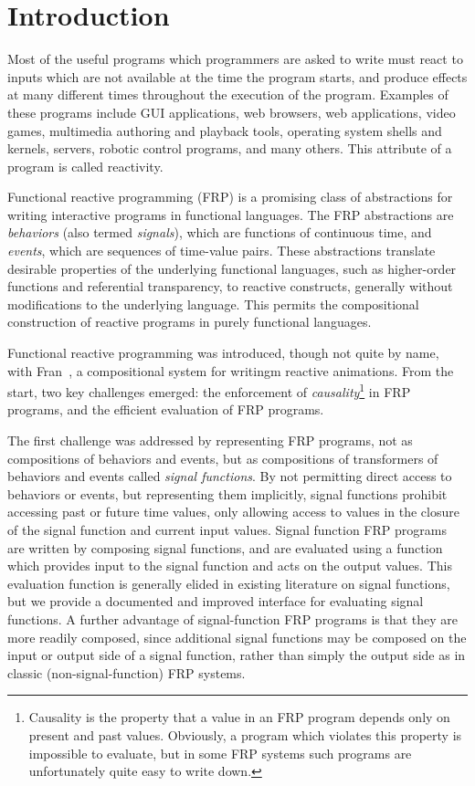 \chapter{Introduction}
\label{chapter:Introduction}

Most of the useful programs which programmers are asked to write must react to inputs which are not available at the time the program starts,
and produce effects at many different times throughout the execution of the program. Examples of these programs include GUI applications,
web browsers, web applications, video games, multimedia authoring and playback tools, operating system shells and kernels, servers,
robotic control programs, and many others. This attribute of a program is called reactivity.

Functional reactive programming (FRP) is a promising class of abstractions for
writing interactive programs in functional languages. The FRP abstractions are
{\em behaviors} (also termed {\em signals}), which are functions of continuous
time, and {\em events}, which are sequences of time-value pairs. These
abstractions translate desirable properties of the underlying functional
languages, such as higher-order functions and referential transparency, to
reactive constructs, generally without modifications to the underlying language.
This permits the compositional construction of reactive programs in purely
functional languages.

Functional reactive programming was introduced, though not quite by name, with
Fran~\cite{Elliott1997}, a compositional system for writingm reactive
animations. From the start, two key challenges emerged: the enforcement of
{\em causality}\footnote{Causality is the property that a value in an FRP
program depends only on present and past values. Obviously, a program which
violates this property is impossible to evaluate, but in some FRP systems such
programs are unfortunately quite easy to write down.} in FRP programs, and the
efficient evaluation of FRP programs.

The first challenge was addressed by representing FRP programs, not as
compositions of behaviors and events, but as compositions of transformers of
behaviors and events called {\em signal functions}. By not permitting direct
access to behaviors or events, but representing them implicitly, signal
functions prohibit accessing past or future time values, only allowing access to
values in the closure of the signal function and current input values. Signal
function FRP programs are written by composing signal functions, and are
evaluated using a function which provides input to the signal function and acts
on the output values. This evaluation function is generally elided in existing
literature on signal functions, but we provide a documented and improved
interface for evaluating signal functions. A further advantage of
signal-function FRP programs is that they are more readily composed,
since additional signal functions may be composed on the input or output side of
a signal function, rather than simply the output side as in classic
(non-signal-function) FRP systems.


